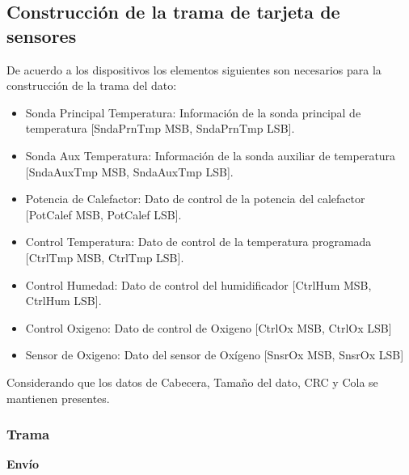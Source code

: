 \documentclass[12pt,a4paper]{article}
\begin{document}
        \begin{twocolsection}
            \subsection{Construcción de la trama de tarjeta de sensores}
            De acuerdo a los dispositivos los elementos siguientes son necesarios para la construcción de la trama del dato:

            \begin{itemize}
                \item Sonda Principal Temperatura: Información de la sonda principal de temperatura [SndaPrnTmp MSB, SndaPrnTmp LSB].
                \item Sonda Aux Temperatura: Información de la sonda auxiliar de temperatura [SndaAuxTmp MSB, SndaAuxTmp LSB].
                \item Potencia de Calefactor: Dato de control de la potencia del calefactor [PotCalef MSB, PotCalef LSB].
                \item Control Temperatura: Dato de control de la temperatura programada [CtrlTmp MSB, CtrlTmp LSB].
                \item Control Humedad: Dato de control del humidificador [CtrlHum MSB, CtrlHum LSB].
                \item Control Oxigeno: Dato de control de Oxigeno [CtrlOx MSB, CtrlOx LSB]
                \item Sensor de Oxigeno: Dato del sensor de Oxígeno [SnsrOx MSB, SnsrOx LSB]
            \end{itemize}

            Considerando que los datos de Cabecera, Tamaño del dato, CRC y Cola se mantienen presentes.
        \end{twocolsection}

        \subsubsection{Trama}
            \textbf{\normalsize{Envío}}
                \begin{center}
                \end{center}
\end{document}
